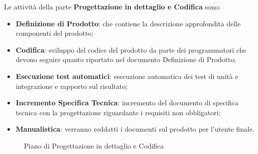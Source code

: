 {{	 Le attività della parte \textbf{Progettazione in dettaglio e Codifica} sono:
	 \begin{itemize}
		 \item \textbf{Definizione di Prodotto}: che contiene la descrizione approfondita delle componenti del prodotto;
		 \item \textbf{Codifica}: sviluppo del codice del prodotto da parte dei programmatori che devono seguire quanto riportato nel documento Definizione di Prodotto;
		 \item \textbf{Esecuzione test automatici}: esecuzione automatica dei test di unità e integrazione e rapporto sul risultato;
		 \item \textbf{Incremento Specifica Tecnica}: incremento del documento di specifica tecnica con la progettazione riguardante i requisiti non obbligatori;
		 \item \textbf{Manualistica}: verranno reddatti i documenti sul prodotto per l'utente finale.
	 \end{itemize}

	\begin{landscape}
		\thispagestyle{empty}
		\begin{figure}[H]
			\parbox[c][\textwidth][s]{\linewidth}{
			\centering
			\vspace*{\fill}
			\vspace*{\fill}
			\label{fig:pianoprogettazdettcodifica}
			\caption{Piano di Progettazione in dettaglio e Codifica}}
		\end{figure}
	\end{landscape}
	
}}
